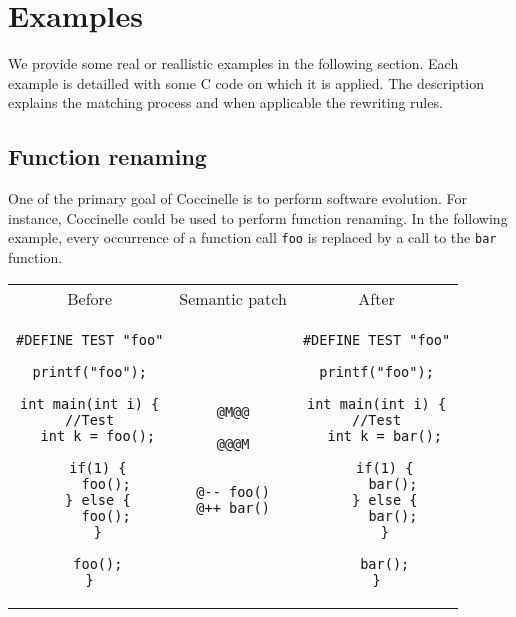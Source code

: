 
\section{Examples}

We provide some real or reallistic examples in the following section.
Each example is detailled with some C code on which it is applied. The
description explains the matching process and when applicable the
rewriting rules.

\subsection{Function renaming}

One of the primary goal of Coccinelle is to perform software
evolution.  For instance, Coccinelle could be used to perform function
renaming. In the following example, every occurrence of a function
call \texttt{foo} is replaced by a call to the \texttt{bar} function.\\

\begin{tabular}{ccc}
Before & Semantic patch & After \\
\begin{minipage}[t]{.3\linewidth}
\begin{lstlisting}
#DEFINE TEST "foo"

printf("foo");

int main(int i) {
//Test
  int k = foo();

  if(1) {
    foo();
  } else {
    foo();
  }

  foo();
}
\end{lstlisting}
\end{minipage}
&
\begin{minipage}[t]{.3\linewidth}
\begin{lstlisting}[language=Cocci]
@M@@

@@@M


@-- foo()
@++ bar()
\end{lstlisting}
\end{minipage}
&
\begin{minipage}[t]{.3\linewidth}
\begin{lstlisting}
#DEFINE TEST "foo"

printf("foo");

int main(int i) {
//Test
  int k = bar();

  if(1) {
    bar();
  } else {
    bar();
  }

  bar();
}
\end{lstlisting}
\end{minipage}\\
\end{tabular}

